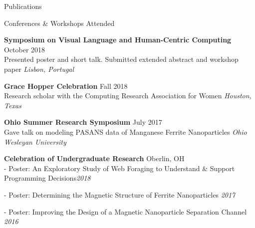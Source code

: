 \documentclass{resume}
\begin{document}
\begin{rSection}{Publications}
\begin{enumerate}
\end{enumerate}






\end{rSection}
\begin{rSection} {Conferences \& Workshops Attended}

{\bf Symposium on Visual Language and Human-Centric Computing} \hfill {October 2018} \\
Presented poster and short talk. Submitted extended abstract and workshop paper \hfill {\em Lisbon, Portugal}

{\bf Grace Hopper Celebration} \hfill {Fall 2018} \\
Research scholar with the Computing Research Association for Women \hfill {\em Houston, Texas}

{\bf Ohio Summer Research Symposium} \hfill {July 2017}\\
Gave talk on modeling PASANS data of Manganese Ferrite Nanoparticles \hfill {\em Ohio Wesleyan University}

{\bf Celebration of Undergraduate Research} \hfill {Oberlin, OH} \\
 {- Poster: An Exploratory Study of Web Foraging to Understand \& Support Programming Decisions}\hfill {\em 2018} 
 
 {- Poster: Determining the Magnetic Structure of Ferrite Nanoparticles} \hfill {\em 2017} 
 
 {- Poster: Improving the Design of a Magnetic Nanoparticle Separation Channel} \hfill {\em 2016}
\end{rSection}
\end{document}
